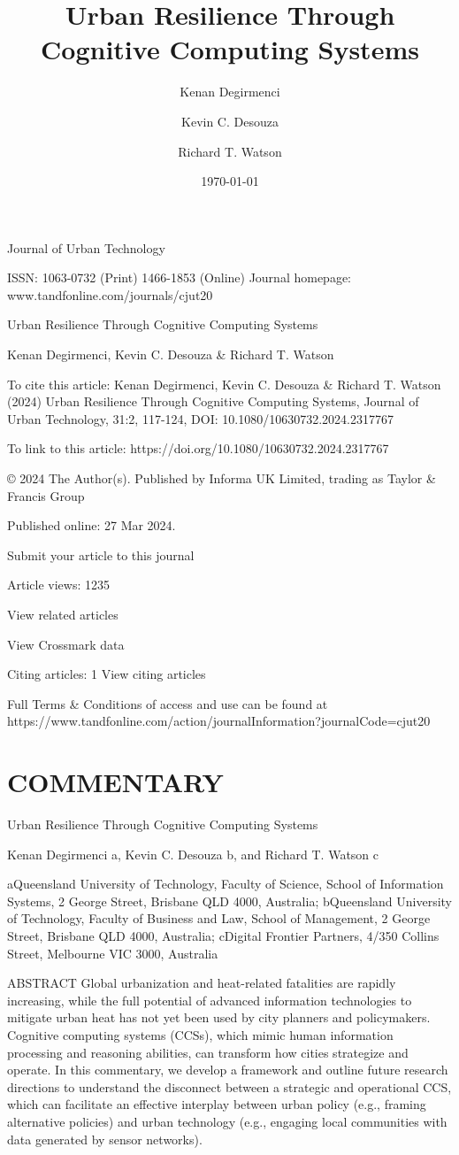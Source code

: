 \documentclass[10pt,a4paper]{article}
\title{Urban Resilience Through Cognitive Computing Systems}
\author{Kenan Degirmenci \and Kevin C. Desouza \and Richard T. Watson}
\date{\today}
\begin{document}
\maketitle

Journal of Urban Technology

ISSN: 1063-0732 (Print) 1466-1853 (Online) Journal homepage: www.tandfonline.com/journals/cjut20

Urban Resilience Through Cognitive Computing Systems

Kenan Degirmenci, Kevin C. Desouza \& Richard T. Watson

To cite this article: Kenan Degirmenci, Kevin C. Desouza \& Richard T. Watson (2024) Urban Resilience Through Cognitive Computing Systems, Journal of Urban Technology, 31:2, 117-124, DOI: 10.1080/10630732.2024.2317767

To link to this article: https://doi.org/10.1080/10630732.2024.2317767

© 2024 The Author(s). Published by Informa UK Limited, trading as Taylor \& Francis Group

Published online: 27 Mar 2024.

Submit your article to this journal

Article views: 1235

View related articles

View Crossmark data

Citing articles: 1 View citing articles

Full Terms \& Conditions of access and use can be found at https://www.tandfonline.com/action/journalInformation?journalCode=cjut20


\section{COMMENTARY}

Urban Resilience Through Cognitive Computing Systems

Kenan Degirmenci a, Kevin C. Desouza b, and Richard T. Watson c

aQueensland University of Technology, Faculty of Science, School of Information Systems, 2 George Street, Brisbane QLD 4000, Australia; bQueensland University of Technology, Faculty of Business and Law, School of Management, 2 George Street, Brisbane QLD 4000, Australia; cDigital Frontier Partners, 4/350 Collins Street, Melbourne VIC 3000, Australia

ABSTRACT Global urbanization and heat-related fatalities are rapidly increasing, while the full potential of advanced information technologies to mitigate urban heat has not yet been used by city planners and policymakers. Cognitive computing systems (CCSs), which mimic human information processing and reasoning abilities, can transform how cities strategize and operate. In this commentary, we develop a framework and outline future research directions to understand the disconnect between a strategic and operational CCS, which can facilitate an eﬀective interplay between urban policy (e.g., framing alternative policies) and urban technology (e.g., engaging local communities with data generated by sensor networks).
\end{document}

